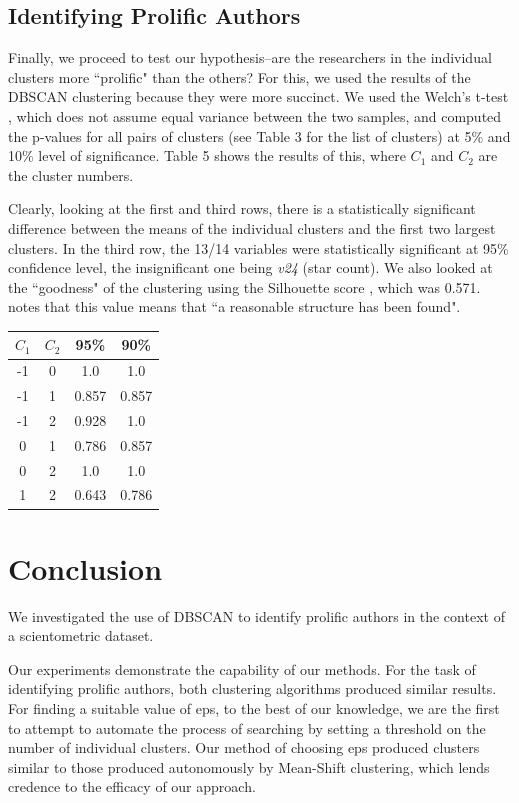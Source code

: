\documentclass[12pt,a4paper,twocolumn]{article}
\begin{document}
	\subsection{Identifying Prolific Authors}
	Finally, we proceed to test our hypothesis--are the researchers in the individual clusters more ``prolific" than the others? For this, we used the results of the DBSCAN clustering because they were more succinct. We used the Welch's t-test \cite{welch1947generalization}, which does not assume equal variance between the two samples, and computed the p-values for all pairs of clusters (see Table 3 for the list of clusters) at 5\% and 10\% level of significance. Table 5 shows the results of this, where $C_1$ and $C_2$ are the cluster numbers.
	
	Clearly, looking at the first and third rows, there is a statistically significant difference between the means of the individual clusters and the first two largest clusters. In the third row, the 13/14 variables were statistically significant at 95\% confidence level, the insignificant one being \textit{v24} (star count). We also looked at the ``goodness" of the clustering using the Silhouette score \cite{rousseeuw1987silhouettes}, which was 0.571. \cite{kaufman2009finding} notes that this value means that ``a reasonable structure has been found".\\
	
	\begin{tabular}{|c|c|c|c|}
		\hline 
		$C_1$ & $C_2$ & \textbf{95\%} & \textbf{90\%} \\ 
		\hline 
		-1 & 0 & 1.0 & 1.0 \\ 
		\hline 
		-1 & 1 & 0.857 & 0.857 \\ 
		\hline 
		-1 & 2 & 0.928 & 1.0 \\ 
		\hline 
		0 & 1 & 0.786 & 0.857 \\ 
		\hline 
		0 & 2 & 1.0 & 1.0 \\ 
		\hline 
		1 & 2 & 0.643 & 0.786 \\ 
		\hline 
	\end{tabular} 
	\begingroup
	\endgroup
	\hfill\break
	
	\section{Conclusion}
	We investigated the use of DBSCAN to identify prolific authors in the context of a scientometric dataset.
	
	Our experiments demonstrate the capability of our methods.  For the task of identifying prolific authors, both clustering algorithms produced similar results. For finding a suitable value of eps, to the best of our knowledge, we are the first to attempt to automate the process of searching by setting a threshold on the number of individual clusters. Our method of choosing eps produced clusters similar to those produced autonomously by Mean-Shift clustering, which lends credence to the efficacy of our approach.
	
	
	
\end{document}
